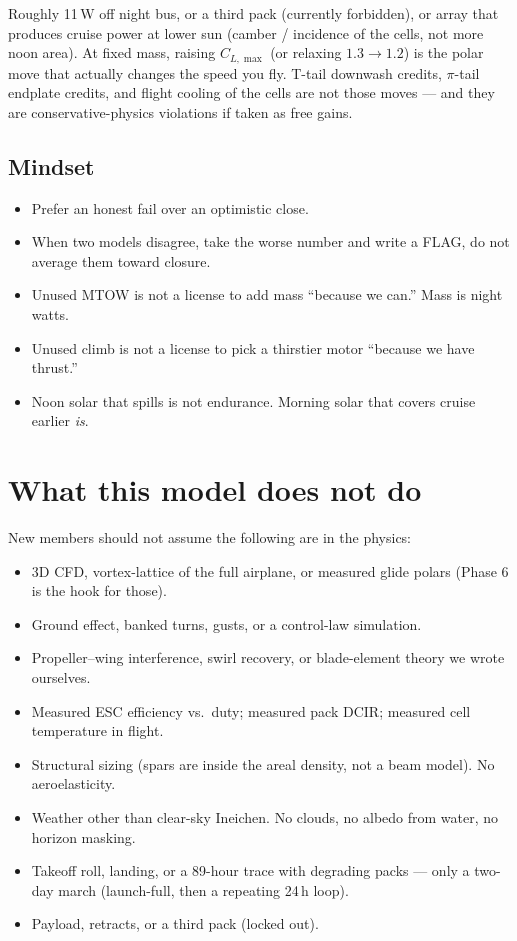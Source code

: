 \documentclass[11pt,letterpaper]{article}
\begin{document}
Roughly 11\,W off night bus, or a third pack (currently forbidden), or array that produces cruise power at lower sun (camber / incidence of the cells, not more noon area). At fixed mass, raising $C_{L,\max}$ (or relaxing $1.3\to 1.2$) is the polar move that actually changes the speed you fly. T-tail downwash credits, $\pi$-tail endplate credits, and flight cooling of the cells are not those moves --- and they are conservative-physics violations if taken as free gains.

\subsection{Mindset}

\begin{itemize}
  \item Prefer an honest fail over an optimistic close.
  \item When two models disagree, take the worse number and write a FLAG, do not average them toward closure.
  \item Unused MTOW is not a license to add mass ``because we can.'' Mass is night watts.
  \item Unused climb is not a license to pick a thirstier motor ``because we have thrust.''
  \item Noon solar that spills is not endurance. Morning solar that covers cruise earlier \emph{is}.
\end{itemize}

\section{What this model does not do}

New members should not assume the following are in the physics:

\begin{itemize}
  \item 3D CFD, vortex-lattice of the full airplane, or measured glide polars (Phase 6 is the hook for those).
  \item Ground effect, banked turns, gusts, or a control-law simulation.
  \item Propeller--wing interference, swirl recovery, or blade-element theory we wrote ourselves.
  \item Measured ESC efficiency vs.\ duty; measured pack DCIR; measured cell temperature in flight.
  \item Structural sizing (spars are inside the areal density, not a beam model). No aeroelasticity.
  \item Weather other than clear-sky Ineichen. No clouds, no albedo from water, no horizon masking.
  \item Takeoff roll, landing, or a 89-hour trace with degrading packs --- only a two-day march (launch-full, then a repeating 24\,h loop).
  \item Payload, retracts, or a third pack (locked out).
\end{itemize}
\end{document}
